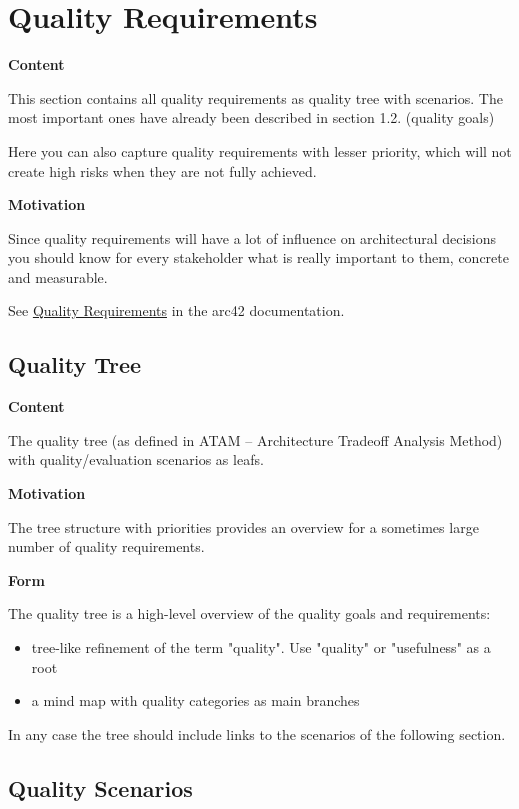 \hypertarget{section-quality-scenarios}{%
\section{Quality Requirements}\label{section-quality-scenarios}}

\textbf{Content}

This section contains all quality requirements as quality tree with
scenarios. The most important ones have already been described in
section 1.2. (quality goals)

Here you can also capture quality requirements with lesser priority,
which will not create high risks when they are not fully achieved.

\textbf{Motivation}

Since quality requirements will have a lot of influence on architectural
decisions you should know for every stakeholder what is really important
to them, concrete and measurable.

See \href{https://docs.arc42.org/section-10/}{Quality Requirements} in
the arc42 documentation.

\hypertarget{_quality_tree}{%
\subsection{Quality Tree}\label{_quality_tree}}

\textbf{Content}

The quality tree (as defined in ATAM -- Architecture Tradeoff Analysis
Method) with quality/evaluation scenarios as leafs.

\textbf{Motivation}

The tree structure with priorities provides an overview for a sometimes
large number of quality requirements.

\textbf{Form}

The quality tree is a high-level overview of the quality goals and
requirements:

\begin{itemize}
\item
  tree-like refinement of the term "quality". Use "quality" or
  "usefulness" as a root
\item
  a mind map with quality categories as main branches
\end{itemize}

In any case the tree should include links to the scenarios of the
following section.

\hypertarget{_quality_scenarios}{%
\subsection{Quality Scenarios}\label{_quality_scenarios}}

